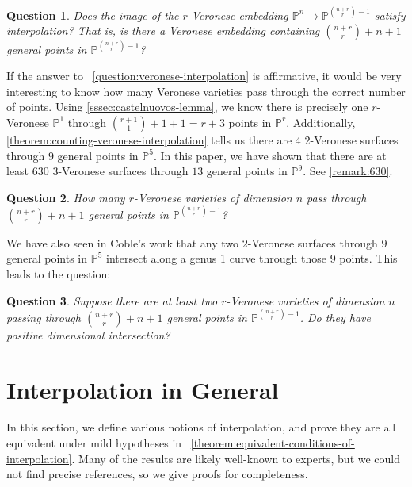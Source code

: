 \documentclass[reqno, 11pt]{amsart}
\newtheorem{question}{Question}
\theoremstyle{definition}
\theoremstyle{remark}
\numberwithin{equation}{section}
\numberwithin{thm}{section}
\numberwithin{prop}{section}
\numberwithin{lem}{section}
\numberwithin{cor}{section}
\numberwithin{conj}{section}
\numberwithin{defn}{section}
\theoremstyle{plain}
\theoremstyle{definition}
\newcommand\bp{{\mathbb P}}
\begin{document}
\begin{question}
	\label{question:veronese-interpolation}
	Does the image of the $r$-Veronese embedding $\bp^n \rightarrow \bp^{\binom{n+r}{r}-1}$ satisfy interpolation?
	That is, is there a Veronese embedding containing
	$\binom{n+r}{r} + n + 1$ general points in $\bp^{\binom{n+r}{r}-1}$?
\end{question}

If the answer to ~\autoref{question:veronese-interpolation}
is affirmative, it would be very interesting to know how many
Veronese varieties pass through the correct number of points.
Using \ref{sssec:castelnuovos-lemma},
we know there is precisely one $r$-Veronese $\bp^1$ through 
$\binom{r+1}{1} + 1 +1  = r+3$ points in $\bp^r$.
Additionally,  \autoref{theorem:counting-veronese-interpolation}
tells us there are $4$ $2$-Veronese surfaces through $9$ general
points in $\bp^5$. In this paper, we have shown that there are at least $630$ $3$-Veronese surfaces through $13$ general points in $\bp^{9}$. See \autoref{remark:630}.


\begin{question}
	\label{question:veronese-enumeration}
	How many $r$-Veronese varieties of dimension
	$n$ pass through
	$\binom{n+r}{r} + n + 1$ general points in $\bp^{\binom{n+r}{r}-1}$?
\end{question}

We have also seen in Coble's work that any two $2$-Veronese
surfaces through $9$ general points in $\bp^5$
intersect along a genus 1 curve through those $9$ points.
This leads to the question:
\begin{question}
	\label{question:intersect-curve}
	Suppose there are at least two $r$-Veronese varieties
	of dimension $n$ passing through
	$\binom{n+r}{r} + n + 1$ general points in $\bp^{\binom{n+r}{r}-1}$.
	Do they have positive dimensional intersection?
\end{question}


\appendix
\section{Interpolation in General}
\label{sec:interpolation-in-general}

In this section, we define various notions of interpolation, and
prove they are all equivalent under mild hypotheses in
~\autoref{theorem:equivalent-conditions-of-interpolation}.
Many of the results are likely well-known to experts, but we could not find precise references, so we give proofs for completeness.
\end{document}
